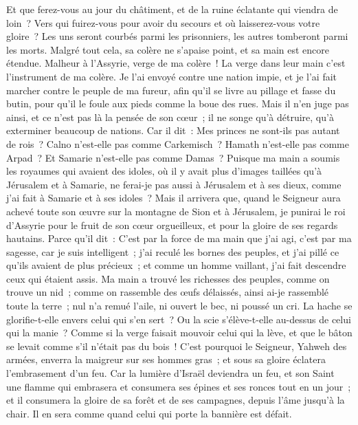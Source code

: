 \begin{multicols}{2}
Et que ferez-vous au jour du châtiment, et de la ruine éclatante qui viendra de loin~? Vers qui fuirez-vous pour avoir du secours et où laisserez-vous votre gloire~?
Les uns seront courbés parmi les prisonniers, les autres tomberont parmi les morts. Malgré tout cela, sa colère ne s'apaise point, et sa main est encore étendue.
Malheur à l'Assyrie, verge de ma colère~! La verge dans leur main c'est l'instrument de ma colère.
Je l'ai envoyé contre une nation impie, et je l'ai fait marcher contre le peuple de ma fureur, afin qu'il se livre au pillage et fasse du butin, pour qu'il le foule aux pieds comme la boue des rues.
Mais il n'en juge pas ainsi, et ce n'est pas là la pensée de son cœur~; il ne songe qu'à détruire, qu'à exterminer beaucoup de nations.
Car il dit~: Mes princes ne sont-ils pas autant de rois~?
Calno n'est-elle pas comme Carkemisch~? Hamath n'est-elle pas comme Arpad~? Et Samarie n'est-elle pas comme Damas~?
Puisque ma main a soumis les royaumes qui avaient des idoles, où il y avait plus d'images taillées qu'à Jérusalem et à Samarie,
ne ferai-je pas aussi à Jérusalem et à ses dieux, comme j'ai fait à Samarie et à ses idoles~?
Mais il arrivera que, quand le Seigneur aura achevé toute son œuvre sur la montagne de Sion et à Jérusalem, je punirai le roi d'Assyrie pour le fruit de son cœur orgueilleux, et pour la gloire de ses regards hautains.
Parce qu'il dit~: C'est par la force de ma main que j'ai agi, c'est par ma sagesse, car je suis intelligent~; j'ai reculé les bornes des peuples, et j'ai pillé ce qu'ils avaient de plus précieux~; et comme un homme vaillant, j'ai fait descendre ceux qui étaient assis.
Ma main a trouvé les richesses des peuples, comme on trouve un nid~; comme on rassemble des œufs délaissés, ainsi ai-je rassemblé toute la terre~; nul n'a remué l'aile, ni ouvert le bec, ni poussé un cri.
La hache se glorifie-t-elle envers celui qui s'en sert~? Ou la scie s'élève-t-elle au-dessus de celui qui la manie~? Comme si la verge faisait mouvoir celui qui la lève, et que le bâton se levait comme s'il n'était pas du bois~!
C'est pourquoi le Seigneur, Yahweh des armées, enverra la maigreur sur ses hommes gras~; et sous sa gloire éclatera l'embrasement d'un feu.
Car la lumière d'Israël deviendra un feu, et son Saint une flamme qui embrasera et consumera ses épines et ses ronces tout en un jour~;
et il consumera la gloire de sa forêt et de ses campagnes, depuis l'âme jusqu'à la chair. Il en sera comme quand celui qui porte la bannière est défait.

\end{multicols}
